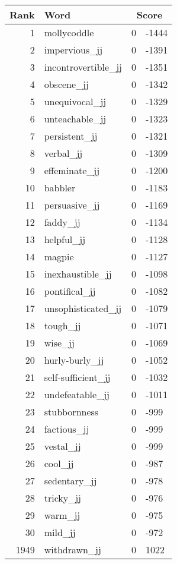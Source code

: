 \begin{longtable}[!htbp]{| rlr@{.}l |}
    \hline
    \textbf{Rank} & \textbf{Word} & \multicolumn{2}{c|}{\textbf{Score}} \\
    \hline
    \endhead
    1 & mollycoddle & 0 & -1444 \\
    2 & impervious\_jj & 0 & -1391 \\
    3 & incontrovertible\_jj & 0 & -1351 \\
    4 & obscene\_jj & 0 & -1342 \\
    5 & unequivocal\_jj & 0 & -1329 \\
    6 & unteachable\_jj & 0 & -1323 \\
    7 & persistent\_jj & 0 & -1321 \\
    8 & verbal\_jj & 0 & -1309 \\
    9 & effeminate\_jj & 0 & -1200 \\
    10 & babbler & 0 & -1183 \\
    11 & persuasive\_jj & 0 & -1169 \\
    12 & faddy\_jj & 0 & -1134 \\
    13 & helpful\_jj & 0 & -1128 \\
    14 & magpie & 0 & -1127 \\
    15 & inexhaustible\_jj & 0 & -1098 \\
    16 & pontifical\_jj & 0 & -1082 \\
    17 & unsophisticated\_jj & 0 & -1079 \\
    18 & tough\_jj & 0 & -1071 \\
    19 & wise\_jj & 0 & -1069 \\
    20 & hurly-burly\_jj & 0 & -1052 \\
    21 & self-sufficient\_jj & 0 & -1032 \\
    22 & undefeatable\_jj & 0 & -1011 \\
    23 & stubbornness & 0 & -999 \\
    24 & factious\_jj & 0 & -999 \\
    25 & vestal\_jj & 0 & -999 \\
    26 & cool\_jj & 0 & -987 \\
    27 & sedentary\_jj & 0 & -978 \\
    28 & tricky\_jj & 0 & -976 \\
    29 & warm\_jj & 0 & -975 \\
    30 & mild\_jj & 0 & -972 \\
    1949 & withdrawn\_jj & 0 & 1022 \\

\end{longtable}
